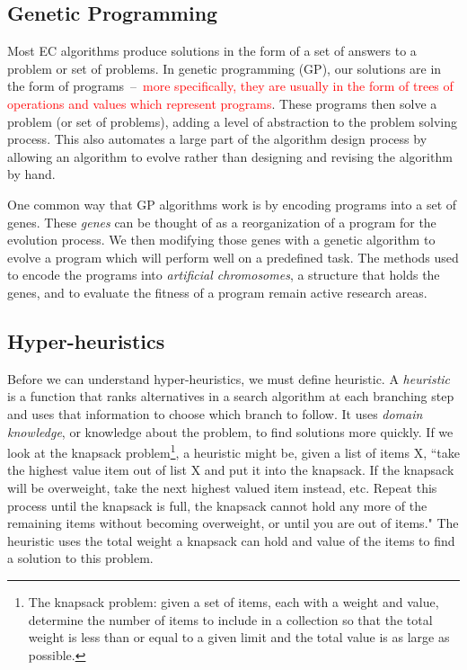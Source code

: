\documentclass{sig-alternate}
\begin{document}
\subsection{Genetic Programming}
\label{sec:GP}
Most EC algorithms produce solutions in the form of a set of answers to a problem or set of problems. In genetic programming (GP), our solutions are in the form of programs~--~\textcolor{red}{more specifically, they are usually in the form of trees of operations and values which represent programs}.
 These programs then solve a problem (or set of problems), adding a level of abstraction to the problem solving process. This also automates a large part of the algorithm design process by allowing an algorithm to evolve rather than designing and revising the algorithm by hand.

One common way that GP algorithms work is by encoding programs into a set of genes. These \textit{genes} can be thought of as a reorganization of a program for the evolution process. We then modifying those genes with a genetic algorithm to evolve a program which will perform well on a predefined task. The methods used to encode the programs into \textit{artificial chromosomes}, a structure that holds the genes, and to evaluate the fitness of a program remain active research areas.

\subsection{Hyper-heuristics}
\label{sec:HH}
Before we can understand hyper-heuristics, we must define heuristic. A \textit{heuristic} is a function that ranks alternatives in a search algorithm at each branching step and uses that information to choose which branch to follow. It uses \textit{domain knowledge}, or knowledge about the problem, to find solutions more quickly. If we look at the knapsack problem\footnote{The knapsack problem: given a set of items, each with a weight and value, determine the number of items to include in a collection so that the total weight is less than or equal to a given limit and the total value is as large as possible.}, a heuristic might be, given a list of items X, ``take the highest value item out of list X and put it into the knapsack. If the knapsack will be overweight, take the next highest valued item instead, etc. Repeat this process until the knapsack is full, the knapsack cannot hold any more of the remaining items without becoming overweight, or until you are out of items." The heuristic uses the total weight a knapsack can hold and value of the items to find a solution to this problem.
\end{document}

